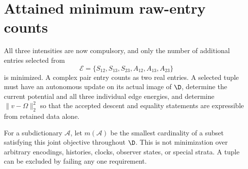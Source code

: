 \section{Attained minimum raw-entry counts}\label{sec:minimum}

All three intensities are now compulsory, and only the number of additional entries selected from
\begin{equation}
\mathscr E=\{S_{12},S_{13},S_{23},A_{12},A_{13},A_{23}\}
\label{eq:dictionary}
\end{equation}
is minimized. A complex pair entry counts as two real entries. A selected tuple must have an autonomous update on its actual image of \(\D\), determine the current potential and all three individual edge energies, and determine \(\|v-\Omega\|_2^2\) so that the accepted descent and equality statements are expressible from retained data alone.

For a subdictionary \(\mathscr A\), let \(m(\mathscr A)\) be the smallest cardinality of a subset satisfying this joint objective throughout \(\D\). This is not minimization over arbitrary encodings, histories, clocks, observer states, or special strata. A tuple can be excluded by failing any one requirement.

